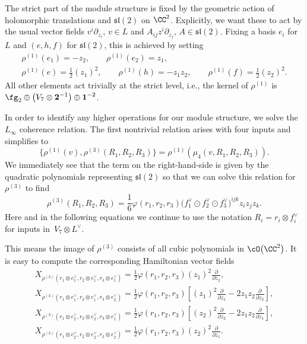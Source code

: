 \documentclass[10pt,a4paper]{amsart}
\numberwithin{equation}{section}
\theoremstyle{definition}
\def\lie#1{\ensuremath{\mathfrak{#1}}}
\begin{document}
The strict part of the module structure is fixed by the geometric action of holomorphic translations and $\lie{sl}(2)$ on $\CC^2$. Explicitly, we want these to act by the usual vector fields
$
 v^i \partial_{z_i}$, $v \in L $ and $ A_{ij}z^i \partial_{z_j}$, $ A \in \mathfrak{sl}(2)$.
Fixing a basis $e_i$ for $L$ and $(e,h,f)$ for $\lie{sl}(2)$, this is achieved by setting
\begin{gather}
 \rho^{(1)}(e_1) = -z_2, \qquad \rho^{(1)}(e_2) = z_1, \nonumber\\
 \rho^{(1)}(e) = \frac{1}{2}(z_1)^2, \qquad \rho^{(1)}(h) = -z_1 z_2, \qquad \rho^{(1)}(f) = \frac{1}{2}(z_2)^2. \label{eq: rho1}
\end{gather}
All other elements act trivially at the strict level, i.e., the kernel of $\rho^{(1)}$ is $\fg_2 \oplus \big(V_7 \otimes \textbf{2}^{-1}\big) \oplus \textbf{1}^{-2}$.

In order to identify any higher operations for our module structure, we solve the $L_\infty$ coherence relation. The first nontrivial relation arises with four inputs and simplifies to
\[%
 \big\{ \rho^{(1)}(v) , \rho^{(3)} (R_1,R_2,R_3) \big\} = \rho^{(1)}(\mu_4(v,R_1,R_2,R_3)).
\]
We immediately see that the term on the right-hand-side is given by the quadratic polynomials representing $\mathfrak{sl}(2)$ so that we can solve this relation for $\rho^{(3)}$ to find
\[
 \rho^{(3)}(R_1, R_2, R_3) = \frac{1}{6} \varphi(r_1,r_2,r_3) \big(f_1^\vee \odot f_2^\vee \odot f_3^\vee\big)^{ijk} z_i z_j z_k.
\]
Here and in the following equations we continue to use the notation $R_i=r_i \otimes f_i^\vee$ for inputs in~${V_7 \otimes L^\vee}$.

This means the image of $\rho^{(3)}$ consists of all cubic polynomials in $\cO\big(\CC^2\big)$.
It is easy to compute the corresponding Hamiltonian vector fields
\begin{gather}
 X_{\rho^{(3)}(r_1 \otimes e_1^\vee,r_2 \otimes e_1^\vee,r_3 \otimes e_1^\vee)} = \frac{1}{2} \varphi(r_1,r_2,r_3) (z_1)^2 \frac{\partial}{\partial z_2},\nonumber \\
 X_{\rho^{(3)}(r_1 \otimes e_1^\vee, r_2 \otimes e_1^\vee, r_3 \otimes e_2^\vee)} = \frac{1}{2} \varphi(r_1,r_2,r_3) \left[ (z_1)^2 \frac{\partial}{\partial z_1} - 2z_1 z_2 \frac{\partial}{\partial z_2} \right],\nonumber\\
 X_{\rho^{(3)}(r_1 \otimes e_2^\vee, r_2 \otimes e_2^\vee, r_3 \otimes e_1^\vee)} = \frac{1}{2} \varphi(r_1,r_2,r_3) \left[ (z_2)^2 \frac{\partial}{\partial z_2} -2z_1 z_2 \frac{\partial}{\partial z_1} \right],\nonumber\\
 X_{\rho^{(3)}(r_1 \otimes e_2^\vee,r_2 \otimes e_2^\vee,r_3 \otimes e_2^\vee)} = \frac{1}{2} \varphi(r_1,r_2,r_3) (z_2)^2 \frac{\partial}{\partial z_1}. \label{eq: rho3}
\end{gather}
\end{document}
